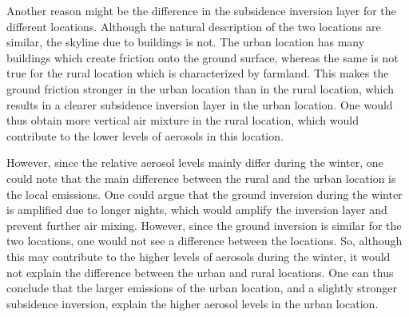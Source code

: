 Another reason might be the difference in the subsidence inversion layer for the different locations. Although the natural description of the two locations are similar, the skyline due to buildings is not. The urban location has many buildings which create friction onto the ground surface, whereas the same is not true for the rural location which is characterized by farmland. This makes the ground friction stronger in the urban location than in the rural location, which results in a clearer subsidence inversion layer in the urban location. One would thus obtain more vertical air mixture in the rural location, which would contribute to the lower levels of aerosols in this location. 

However, since the relative aerosol levels mainly differ during the winter, one could note that the main difference between the rural and the urban location is the local emissions. One could argue that the ground inversion during the winter is amplified due to longer nights, which would amplify the inversion layer and prevent further air mixing. However, since the ground inversion is similar for the two locations, one would not see a difference between the locations. So, although this may contribute to the higher levels of aerosols during the winter, it would not explain the difference between the urban and rural locations. One can thus conclude that the larger emissions of the urban location, and a slightly stronger subsidence inversion, explain the higher aerosol levels in the urban location.
